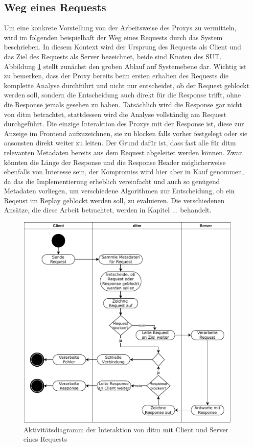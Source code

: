 \documentclass[12pt,a4paper]{report}
\begin{document}
\subsection{Weg eines Requests}
Um eine konkrete Vorstellung von der Arbeitsweise des Proxys zu vermitteln, wird im folgenden beispielhaft der Weg eines
Requests durch das System beschrieben. In diesem Kontext wird der Ursprung des Requests als Client und das Ziel des
Requests als Server bezeichnet, beide sind Knoten des SUT. Abbildung \ref{fig:activity} stellt zunächst den groben Ablauf auf Systemebene dar.
Wichtig ist zu bemerken, dass der Proxy bereits beim ersten erhalten des Requests die komplette Analyse durchführt und
nicht nur entscheidet, ob der Request geblockt werden soll, sondern die Entscheidung auch direkt für die Response trifft,
ohne die Response jemals gesehen zu haben. Tatsächlich wird die Response gar nicht von ditm betrachtet, stattdessen wird
die Analyse vollständig am Request durchgeführt. Die einzige Interaktion des Proxys mit der Response ist, diese zur Anzeige im
Frontend aufzuzeichnen, sie zu blocken falls vorher festgelegt oder sie ansonsten direkt weiter zu leiten.
Der Grund dafür ist, dass fast alle für ditm relevanten Metadaten bereits aus dem Request abgeleitet werden können. Zwar
könnten die Länge der Response und die Response Header möglicherweise ebenfalls von Interesse sein, der Kompromiss wird
hier aber in Kauf genommen, da das die Implementierung erheblich vereinfacht und auch so genügend Metadaten vorliegen,
um verschiedene Algorithmen zur Entscheidung, ob ein Reqeust im Replay geblockt werden soll, zu evaluieren.
Die verschiedenen Ansätze, die diese Arbeit betrachtet, werden in Kapitel ... behandelt.
\begin{figure}[H]
	\centering
    \includegraphics[width=\linewidth]{img/ditm-Activity.pdf}
    \caption{Aktivitätsdiagramm der Interaktion von ditm mit Client und Server eines Requests}
    \label{fig:activity}
\end{figure}
\end{document}

